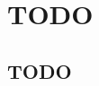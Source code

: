 \documentclass[../sample_report.tex]{subfiles}
\begin{document}
\chapter{TODO} \label{app:A_TODO}

\section{TODO}
\end{document}
